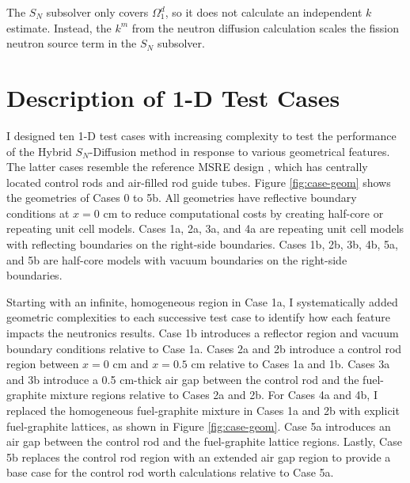 The $S_N$ subsolver only covers $\Omega^d_1$, so it does not calculate an independent $k$
estimate. Instead, the $k^m$ from the neutron diffusion calculation scales the fission neutron
source term in the $S_N$ subsolver.

\section{Description of 1-D Test Cases} \label{sec:test-case}

I designed ten 1-D test cases with increasing complexity to test the performance of the Hybrid
$S_N$-Diffusion method in response to various geometrical features. The latter cases resemble the
reference \gls{MSRE} design \cite{robertson_msre_1965}, which has centrally located control rods
and air-filled rod guide tubes. Figure \ref{fig:case-geom} shows the geometries of Cases 0 to
5b. All geometries have reflective boundary conditions at $x=0$ cm to reduce computational costs by
creating half-core or repeating unit cell models. Cases 1a, 2a, 3a, and 4a are repeating unit
cell models with reflecting boundaries on the right-side boundaries. Cases 1b, 2b, 3b, 4b, 5a, and
5b are half-core models with vacuum boundaries on the right-side boundaries.

Starting with an infinite, homogeneous region in Case 1a, I systematically added geometric
complexities to each successive test case to identify how each feature impacts the neutronics
results. Case 1b introduces a reflector region and vacuum boundary conditions relative to Case 1a.
Cases 2a and 2b introduce a control rod region between $x=0$ cm and $x=0.5$ cm relative to Cases 1a
and 1b. Cases 3a and 3b introduce a 0.5 cm-thick air gap between the control rod and the
fuel-graphite mixture regions relative to Cases 2a and 2b. For Cases 4a and 4b, I replaced the
homogeneous fuel-graphite mixture in Cases 1a and 2b with explicit fuel-graphite lattices, as shown
in Figure \ref{fig:case-geom}. Case 5a introduces an air gap between the control rod and the
fuel-graphite lattice regions. Lastly, Case 5b replaces the control rod region with an extended
air gap region to provide a base case for the control rod worth calculations relative to Case 5a.

